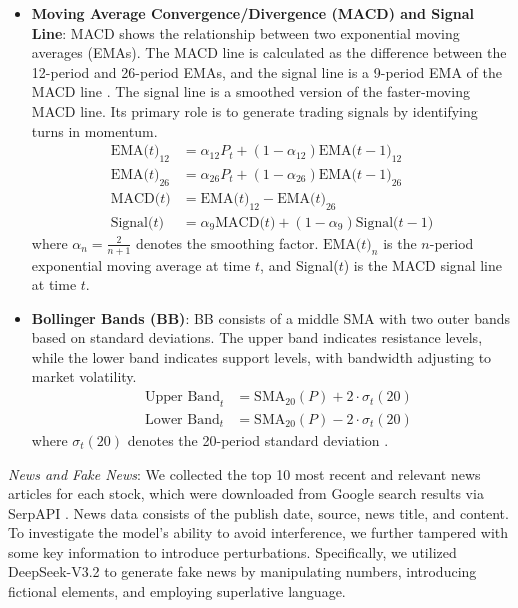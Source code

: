 \documentclass[conference]{IEEEtran}
\begin{document}
\begin{itemize}
    \item {\bf Moving Average Convergence/Divergence (MACD) and Signal Line}: MACD shows the relationship between two exponential moving averages (EMAs). The MACD line is calculated as the difference between the 12-period and 26-period EMAs, and the signal line is a 9-period EMA of the MACD line \cite{murphy1999technical}. The signal line is a smoothed version of the faster-moving MACD line. Its primary role is to generate trading signals by identifying turns in momentum.
    \begin{equation}
\begin{aligned}
\text{EMA($t$)}_{12} & = \alpha_{12} P_t + (1 - \alpha_{12}) \text{EMA($t-1$)}_{12} \\
\text{EMA($t$)}_{26} & = \alpha_{26} P_t + (1 - \alpha_{26}) \text{EMA($t-1$)}_{26} \\
\text{MACD($t$)}& = \text{EMA($t$)}_{12} - \text{EMA($t$)}_{26} \\
\text{Signal($t$)} & = \alpha_9 \text{MACD($t$)} + (1 - \alpha_9) \text{Signal($t-1$)}
\label{eq:macd_formula}
\end{aligned}
\end{equation}
where $\alpha_n = \frac{2}{n+1}$ denotes the smoothing factor. $\text{EMA($t$)}_{n}$ is the $n$-period exponential moving average at time $t$, and Signal($t$) is the MACD signal line at time $t$.
    \item {\bf Bollinger Bands (BB)}: BB consists of a middle SMA with two outer bands based on standard deviations. The upper band indicates resistance levels, while the lower band indicates support levels, with bandwidth adjusting to market volatility.
\begin{equation}
\begin{aligned}
\quad \text{Upper Band}_t &= \text{SMA}_{20}(P) + 2 \cdot \sigma_t(20) \\
\quad \text{Lower Band}_t &= \text{SMA}_{20}(P) - 2 \cdot \sigma_t(20)
\label{eq:bb_formula}
\end{aligned}
\end{equation}
where $\sigma_t(20)$ denotes the 20-period standard deviation \cite{bollinger2002bollinger}.
\end{itemize}

\textit{News and Fake News}: 
We collected the top 10 most recent and relevant news articles for each stock, which were downloaded from Google search results via SerpAPI \cite{serpapi}. 
News data consists of the publish date, source, news title, and content. 
To investigate the model's ability to avoid interference, we further tampered with some key information to introduce perturbations.  
Specifically, we utilized DeepSeek-V3.2 \cite{DeepSeek-V3.2} to generate fake news by manipulating numbers, introducing fictional elements, and employing superlative language. 
\end{document}
